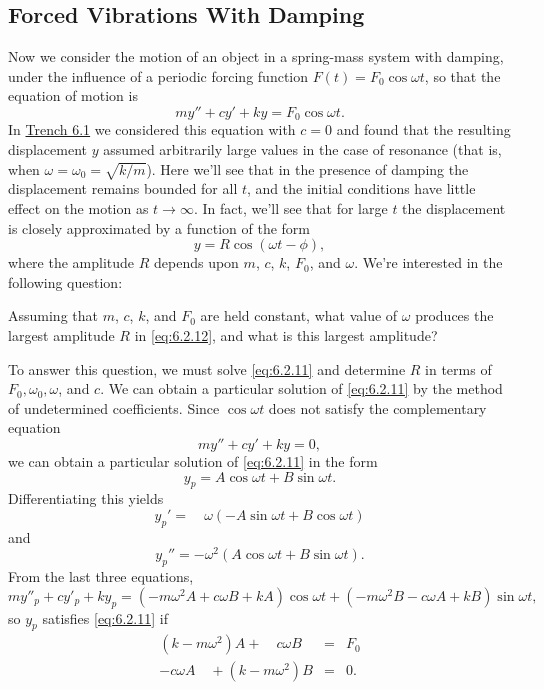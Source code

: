 \documentclass{ximera}
\begin{document}
\subsection{Forced Vibrations With Damping}
 
Now we consider the motion of an object in a spring-mass system with
damping, under the influence of a periodic forcing function
$F(t)=F_0\cos\omega t$, so that the equation of motion is
\begin{equation}\label{eq:6.2.11}
my''+cy'+ky=F_0\cos\omega t.
\end{equation}
In \href{https://ximera.osu.edu/ode/main/springProblemsI/springProblemsI}{Trench 6.1} we considered this equation with $c=0$ and
found that the resulting displacement $y$ assumed arbitrarily large
values in the case of resonance   (that is, when
$\omega=\omega_0=\sqrt{k/m}$). Here we'll see that in the presence
of damping the displacement remains bounded for all $t$, and the
initial conditions have little effect on the motion as $t\rightarrow\infty$.
In fact, we'll see that for large $t$ the displacement is closely
approximated by a function of the form
\begin{equation}\label{eq:6.2.12}
y=R\cos(\omega t-\phi),
\end{equation}
where the amplitude $R$ depends upon $m$, $c$, $k$, $F_0$, and
$\omega$. We're interested in the following question:
 
\begin{question}Assuming that $m$, $c$, $k$, and $F_0$ are
held constant, what value of $\omega$ produces the largest amplitude
$R$ in \eqref{eq:6.2.12}, and what is this largest amplitude?
\end{question}
 
To answer this question, we must solve \eqref{eq:6.2.11} and determine $R$ in
terms of $F_0,\omega_0,\omega$, and $c$. We can obtain a particular
solution of \eqref{eq:6.2.11} by the method of undetermined coefficients.
Since $\cos\omega t$ does not satisfy the complementary equation
$$
my''+cy'+ky=0,
$$
we can obtain a particular solution of \eqref{eq:6.2.11} in the form
\begin{equation}\label{eq:6.2.13}
y_p=A\cos\omega t+B\sin\omega t.
\end{equation}
Differentiating this yields
$$
y_p'=\quad\omega (-A\sin\omega t+B\cos\omega t)
$$
and
$$
y_p''=-\omega^2(A\cos\omega t+B\sin\omega t).
$$
 From the last three equations,
$$
my''_p+cy'_p+ky_p=(-m\omega^2A+c\omega B+kA)\cos\omega t+
(-m\omega^2 B-c\omega A+kB)\sin\omega t,
$$
so $y_p$ satisfies  \eqref{eq:6.2.11}  if
$$
\begin{array}{lll}
(k-m\omega^2) A+\quad c\omega B &=&F_0\\
-c\omega A\quad+(k-m\omega^2)B&=&0.
\end{array}
$$
 
\end{document}

